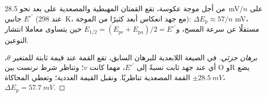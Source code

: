 \begin{proposition}\label{prop:b3:electrode-kinetics:delta-ep}
من أجل موجة عكوسة، تقع القمتان المهبطية والمصعدية على بعد نحو \qty{28.5}{mV}$/n$
على جانبي $E^{\circ\prime}$ (عند \qty{298}{K}، مع جهد انعكاس أبعد كثيرًا من الموجة):
$\Delta E_{\mathrm p} \approx 57/n$ mV، مستقلًا عن سرعة المسح، و$E_{1/2} = (E_{\mathrm{pc}} + E_{\mathrm{pa}})/2 =
E^{\circ\prime}$ حين يتساوى معاملا انتشار النوعين.
\end{proposition}

\begin{proof}[برهان جزئي]
في الصيغة اللابعدية للبرهان السابق، تقع القمة عند قيمة ثابتة
للمتغير $\theta$، أي عند جهد ثابت نسبةً إلى $E^{\circ\prime}$، مهما كانت $v$؛ 
وتناظر شرط نرنست بين O وR يضع القمة المصعدية
تناظريًا. ونقبل القيمة العددية؛ وتعطي المحاكاة
$\pm\qty{28.5}{mV}$، $\Delta E_{\mathrm p} = \qty{57.7}{mV}$.
\end{proof}

